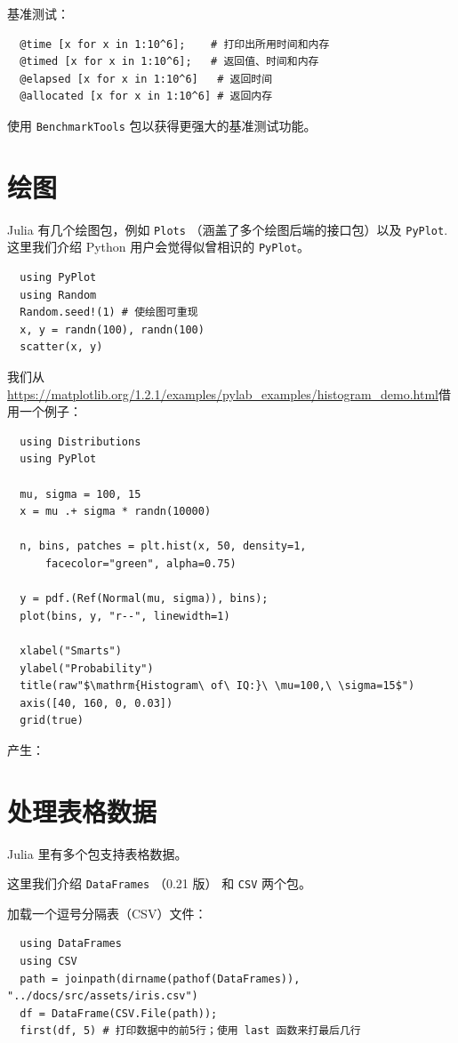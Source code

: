 \documentclass[10pt,a4paper]{article}
\begin{document}
基准测试：
\begin{lstlisting}
  @time [x for x in 1:10^6];    # 打印出所用时间和内存
  @timed [x for x in 1:10^6];   # 返回值、时间和内存
  @elapsed [x for x in 1:10^6]   # 返回时间
  @allocated [x for x in 1:10^6] # 返回内存
\end{lstlisting}
使用 \lstinline|BenchmarkTools| 包以获得更强大的基准测试功能。

\section{绘图}
\label{sec:plot}
Julia 有几个绘图包，例如 \lstinline|Plots| （涵盖了多个绘图后端的接口包）以及 \lstinline|PyPlot|.
这里我们介绍 Python 用户会觉得似曾相识的 \lstinline|PyPlot|。
\begin{lstlisting}
  using PyPlot
  using Random
  Random.seed!(1) # 使绘图可重现
  x, y = randn(100), randn(100)
  scatter(x, y)
\end{lstlisting}

我们从\url{https://matplotlib.org/1.2.1/examples/pylab_examples/histogram_demo.html}借用一个例子：
\begin{lstlisting}
  using Distributions
  using PyPlot

  mu, sigma = 100, 15
  x = mu .+ sigma * randn(10000)

  n, bins, patches = plt.hist(x, 50, density=1,
      facecolor="green", alpha=0.75)

  y = pdf.(Ref(Normal(mu, sigma)), bins);
  plot(bins, y, "r--", linewidth=1)

  xlabel("Smarts")
  ylabel("Probability")
  title(raw"$\mathrm{Histogram\ of\ IQ:}\ \mu=100,\ \sigma=15$")
  axis([40, 160, 0, 0.03])
  grid(true)
\end{lstlisting}

产生：


\section{处理表格数据}

Julia 里有多个包支持表格数据。

这里我们介绍 \lstinline|DataFrames| （0.21 版） 和 \lstinline|CSV| 两个包。

加载一个逗号分隔表（CSV）文件：
\begin{lstlisting}
  using DataFrames
  using CSV
  path = joinpath(dirname(pathof(DataFrames)), "../docs/src/assets/iris.csv")
  df = DataFrame(CSV.File(path));
  first(df, 5) # 打印数据中的前5行；使用 last 函数来打最后几行
\end{lstlisting}
\end{document}
